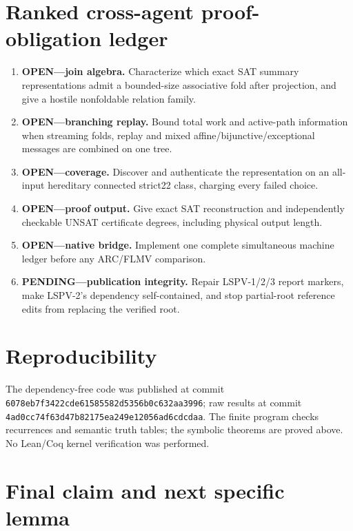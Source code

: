 \documentclass[11pt]{article}
\begin{document}
\section{Ranked cross-agent proof-obligation ledger}

\begin{enumerate}
\item \textbf{OPEN---join algebra.} Characterize which exact SAT summary representations admit a
bounded-size associative fold after projection, and give a hostile nonfoldable relation family.
\item \textbf{OPEN---branching replay.} Bound total work and active-path information when streaming
folds, replay and mixed affine/bijunctive/exceptional messages are combined on one tree.
\item \textbf{OPEN---coverage.} Discover and authenticate the representation on an all-input
hereditary connected strict22 class, charging every failed choice.
\item \textbf{OPEN---proof output.} Give exact SAT reconstruction and independently checkable UNSAT
certificate degrees, including physical output length.
\item \textbf{OPEN---native bridge.} Implement one complete simultaneous machine ledger before any
ARC/FLMV comparison.
\item \textbf{PENDING---publication integrity.} Repair LSPV-1/2/3 report markers, make LSPV-2's
dependency self-contained, and stop partial-root reference edits from replacing the verified root.
\end{enumerate}

\section{Reproducibility}

The dependency-free code
was published at commit \texttt{6078eb7f3422cde61585582d5356b0c632aa3996}; raw results
at commit \texttt{4ad0cc74f63d47b82175ea249e12056ad6cdcdaa}.  The finite program checks
recurrences and semantic truth tables; the symbolic theorems are proved above.  No Lean/Coq kernel
verification was performed.

\section{Final claim and next specific lemma}
\end{document}
